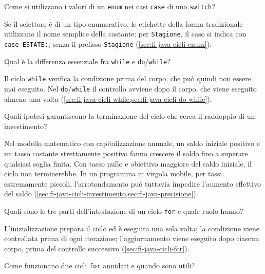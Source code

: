 \begin{exercise}
\label{ex:fi-esercizi-java-cicli-switch-enum}
Come si utilizzano i valori di un \texttt{enum} nei casi
\texttt{case} di uno \texttt{switch}?
\end{exercise}

Se il selettore è di un tipo enumerativo, le etichette della
forma tradizionale utilizzano il nome semplice della costante:
per \texttt{Stagione}, il caso si indica con
\texttt{case ESTATE:}, senza il prefisso
\texttt{Stagione} (\cref{sec:fi-java-cicli-enum}).

\begin{exercise}
\label{ex:fi-esercizi-java-cicli-while-do}
Qual è la differenza essenziale fra \texttt{while} e
\texttt{do}/\texttt{while}?
\end{exercise}

Il ciclo \texttt{while} verifica la condizione prima del corpo,
che può quindi non essere mai eseguito. Nel
\texttt{do}/\texttt{while} il controllo avviene dopo il corpo,
che viene eseguito almeno una volta
(\cref{sec:fi-java-cicli-while,sec:fi-java-cicli-do-while}).

\begin{exercise}
\label{ex:fi-esercizi-java-cicli-investimento-terminazione}
Quali ipotesi garantiscono la terminazione del ciclo che cerca
il raddoppio di un investimento?
\end{exercise}

Nel modello matematico con capitalizzazione annuale, un saldo
iniziale positivo e un tasso costante strettamente positivo fanno
crescere il saldo fino a superare qualsiasi soglia finita. Con tasso
nullo e obiettivo maggiore del saldo iniziale, il ciclo non
terminerebbe. In un programma in virgola mobile, per tassi estremamente piccoli,
l'arrotondamento può tuttavia impedire l'aumento effettivo del saldo
(\cref{sec:fi-java-cicli-investimento,sec:fi-java-precisione}).

\begin{exercise}
\label{ex:fi-esercizi-java-cicli-for-tre-parti}
Quali sono le tre parti dell'intestazione di un ciclo
\texttt{for} e quale ruolo hanno?
\end{exercise}

L'inizializzazione prepara il ciclo ed è eseguita una sola volta;
la condizione viene controllata prima di ogni iterazione;
l'aggiornamento viene eseguito dopo ciascun corpo, prima del
controllo successivo
(\cref{sec:fi-java-cicli-for}).

\begin{exercise}
\label{ex:fi-esercizi-java-cicli-for-annidati}
Come funzionano due cicli \texttt{for} annidati e quando
sono utili?
\end{exercise}

